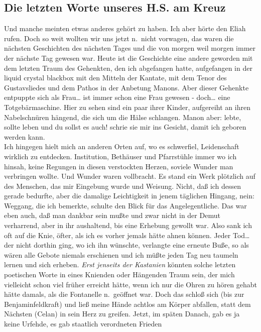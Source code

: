 \documentclass[
]{article}
\author{}
\date{\vspace{-2.5em}}
\begin{document}
\subsection{Die letzten Worte unseres H.S. am
Kreuz}\label{die-letzten-worte-unseres-h.s.-am-kreuz}

Und manche meinten etwas anderes gehört zu haben. Ich aber hörte den
Eliah rufen. Doch so weit wollten wir uns jetzt n.~nicht vorwagen, das
waren die nächsten Geschichten des nächsten Tages und die von morgen
weil morgen immer der nächste Tag gewesen war. Heute ist die Geschichte
eine andere geworden mit dem letzten Traum des Gehenkten, den ich
abgefangen hatte, aufgefangen in der liquid crystal blackbox mit den
Mitteln der Kantate, mit dem Tenor des Gustavsliedes und dem Pathos in
der Anbetung Manons. Aber dieser Gehenkte entpuppte sich als
Frau\ldots{} ist immer schon eine Frau gewesen - doch\ldots{} eine
Totgebärmaschine. Hier zu sehen sind ein paar ihrer Kinder, aufgereiht
an ihren Nabelschnüren hängend, die sich um die Hälse schlangen. Manon
aber: lebte, sollte leben und du sollst es auch! schrie sie mir ins
Gesicht, damit ich geboren werden kann.\\
Ich hingegen hielt mich an anderen Orten auf, wo es schwerfiel,
Leidenschaft wirklich zu entdecken. Institution, Bethäuser und
Pfarrstühle immer wo ich hinsah, keine Regungen in diesen verstockten
Herzen, soviele Wunder man verbringen wollte. Und Wunder waren
vollbracht. Es stand ein Werk plötzlich auf des Menschen, das mir
Eingebung wurde und Weisung. Nicht, daß ich dessen gerade bedurfte, aber
die damalige Leichtigkeit in jenem täglichen Hingang, nein: Weggang, die
ich bemerkte, schulte den Blick für das Angelegentliche. Das war eben
auch, daß man dankbar sein mußte und zwar nicht in der Demut verharrend,
aber in ihr aushaltend, bis eine Erhebung gewollt war. Also sank ich oft
auf die Knie, öfter, als ich es vorher jemals hätte ahnen können. Jeder
Tod\ldots{} der nicht dorthin ging, wo ich ihn wünschte, verlangte eine
erneute Buße, so als wären alle Gebote niemals erschienen und ich müßte
jeden Tag neu taumeln lernen und sich erheben. \emph{Erst jenseits der
Kastanien }könnten solche letzten poetischen Worte in eines Knienden
oder Hängenden Traum sein, der mich vielleicht schon viel früher
erreicht hätte, wenn ich nur die Ohren zu hören gehabt hätte damals, als
die Fontanelle n.~geöffnet war. Doch das schloß sich (bis zur
Benjaminfeldkraft) und ließ meine Hände achtlos am Körper abfallen,
statt dem Nächsten (Celan) in sein Herz zu greifen. Jetzt, im späten
Danach, gab es ja keine Urfehde, es gab staatlich verordneten Frieden
\end{document}
